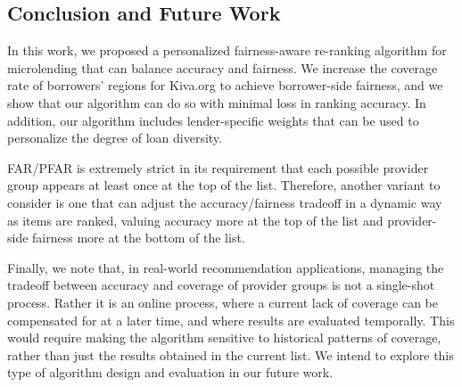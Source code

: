 \subsection{Conclusion and Future Work}
\label{subsect:far_conclusion}

In this work, we proposed a personalized fairness-aware re-ranking algorithm for microlending that can balance accuracy and fairness. We increase the coverage rate of borrowers' regions for Kiva.org to achieve borrower-side fairness, and we show that our algorithm can do so with minimal loss in ranking accuracy. In addition, our algorithm includes lender-specific weights that can be used to personalize the degree of loan diversity.



FAR/PFAR is extremely strict in its requirement that each possible provider group appears at least once at the top of the list. Therefore, another variant to consider is one that can adjust the accuracy/fairness tradeoff in a dynamic way as items are ranked, valuing accuracy more at the top of the list and provider-side fairness more at the bottom of the list.

Finally, we note that, in real-world recommendation applications, managing the tradeoff between accuracy and coverage of provider groups is not a single-shot process. Rather it is an online process, where a current lack of coverage can be compensated for at a later time, and where results are evaluated temporally. This would require making the algorithm sensitive to historical patterns of coverage, rather than just the results obtained in the current list. We intend to explore this type of algorithm design and evaluation in our future work.


